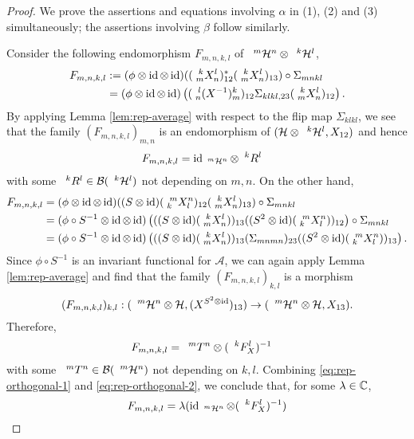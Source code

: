 \begin{proof}
  We prove the assertions and equations involving $\alpha$ in (1), (2)
  and (3)  simultaneously; the assertions involving $\beta$  follow similarly.

  Consider
  the following endomorphism $F_{m,n,k,l}$ of $\Gru{\mathcal{H}}{m}{n}\otimes \Gru{\mathcal{H}}{k}{l}$, 
  \begin{align*}
    F_{m,n,k,l}
    &:=(\phi \otimes \id \otimes \id)((\Gr{X}{k}{l}{m}{n})_{12}^{*}(\Gr{X}{k}{l}{m}{n})_{13})
    \circ \Sigma_{mnkl} \\ &= (\phi \otimes \id \otimes
    \id)\left((\Gr{(X^{-1})}{l}{k}{n}{m})_{12}
      \Sigma_{klkl,23}(\Gr{X}{k}{l}{m}{n})_{12}\right).
  \end{align*}
  By applying Lemma \ref{lem:rep-average} with respect to the flip map $\Sigma_{klkl}$, we see that the family $(F_{m,n,k,l})_{m,n}$ is
  an endomorphism of $(\mathcal{H} \otimes \Gru{\mathcal{H}}{k}{l}, X_{12})$ and hence
  \begin{align}
    F_{m,n,k,l} &= \id_{\Gru{\mathcal{H}}{m}{n}} \otimes \Gru{R}{k}{l} \label{eq:rep-orthogonal-1}
  \end{align}
  with some $\Gru{R}{k}{l} \in \mathcal{B}(\Gru{\mathcal{H}}{k}{l})$ not
  depending on $m,n$. %
  On the other hand, 
  \begin{align*}
    F_{m,n,k,l} &= (\phi \otimes \id \otimes \id)((S \otimes
    \id)(\Gr{X}{m}{n}{k}{l})_{12}(\Gr{X}{k}{l}{m}{n})_{13})
    \circ \Sigma_{mnkl} \\
    &= (\phi\circ S^{-1} \otimes \id \otimes \id)\left(((S \otimes
      \id)(\Gr{X}{k}{l}{m}{n}))_{13}
      ((S^{2} \otimes \id)(\Gr{X}{m}{n}{k}{l}))_{12}\right)     \circ \Sigma_{mnkl}\\
    &= (\phi\circ S^{-1} \otimes \id \otimes \id)\left(((S \otimes
      \id)(\Gr{X}{k}{l}{m}{n}))_{13} (\Sigma_{mnmn})_{23} ((S^{2}
      \otimes \id)(\Gr{X}{m}{n}{k}{l}))_{13}\right).
  \end{align*}
  Since $\phi\circ S^{-1}$ is an invariant functional for
  $\mathscr{A}$, we can again apply Lemma \ref{lem:rep-average} and
  find that the family $(F_{m,n,k,l})_{k,l}$ is a morphism \[(F_{m,n,k,l})_{k,l}:
  (\Gru{\mathcal{H}}{m}{n} \otimes \mathcal{H}, (X^{S^{2} \otimes
    \id})_{13})\rightarrow (\Gru{\mathcal{H}}{m}{n} \otimes \mathcal{H},
  X_{13}).\] Therefore,
  \begin{align}
    F_{m,n,k,l} &= \Gru{T}{m}{n} \otimes (\Gru{F_{X}}{k}{l})^{-1} \label{eq:rep-orthogonal-2}
  \end{align}
  with some $\Gru{T}{m}{n} \in \mathcal{B}(\Gru{\mathcal{H}}{m}{n})$
  not depending on $k,l$. Combining \eqref{eq:rep-orthogonal-1} and
  \eqref{eq:rep-orthogonal-2}, we conclude that, for some $\lambda\in \C$, \[F_{m,n,k,l} = \lambda
  (\id_{\Gru{\mathcal{H}}{m}{n}} \otimes (\Gru{F_{X}}{k}{l})^{-1})\]
  

\end{proof}
